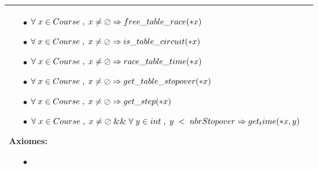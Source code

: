 \documentclass[a4paper, 11pt, oneside]{article}
\begin{document}
\begin{tabular}{|p{17cm}|c}
\begin{itemize}
						\item[$\bullet$] $\forall \hspace{1mm} x \in Course \hspace{1mm} , \hspace{1mm} x \neq \oslash \Rightarrow free\_table\_race(*x)$
						\item[$\bullet$] $\forall \hspace{1mm} x \in Course \hspace{1mm} , \hspace{1mm} x \neq \oslash \Rightarrow is\_table\_circuit(*x)$
						\item[$\bullet$] $\forall \hspace{1mm} x \in Course \hspace{1mm} , \hspace{1mm} x \neq \oslash \Rightarrow race\_table\_time(*x)$
						\item[$\bullet$] $\forall \hspace{1mm} x \in Course \hspace{1mm} , \hspace{1mm} x \neq \oslash \Rightarrow get\_table\_stopover(*x)$
						\item[$\bullet$] $\forall \hspace{1mm} x \in Course \hspace{1mm} , \hspace{1mm} x \neq \oslash \Rightarrow get\_step(*x)$
						\item[$\bullet$] $\forall \hspace{1mm} x \in Course \hspace{1mm} , \hspace{1mm} x \neq \oslash  \hspace{1mm} \&\& \hspace{1mm} \forall \hspace{1mm} y \in int \hspace{1mm} , \hspace{1mm} y \hspace{1mm} < \hspace{1mm} nbrStopover \Rightarrow get_time(*x, y)$
					\end{itemize}

				\textbf{Axiomes:}
					\begin{itemize}
						\item[$\bullet$]
					\end{itemize}

				\\
				\hline
			\end{tabular}
\end{document}
